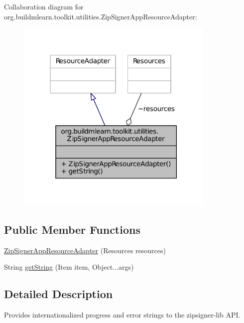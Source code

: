 Collaboration diagram for org.\-buildmlearn.\-toolkit.\-utilities.\-Zip\-Signer\-App\-Resource\-Adapter\-:
\nopagebreak
\begin{figure}[H]
\begin{center}
\leavevmode
\includegraphics[width=270pt]{d7/d6e/classorg_1_1buildmlearn_1_1toolkit_1_1utilities_1_1ZipSignerAppResourceAdapter__coll__graph}
\end{center}
\end{figure}
\subsection*{Public Member Functions}
\begin{DoxyCompactItemize}
\item 
\hyperlink{classorg_1_1buildmlearn_1_1toolkit_1_1utilities_1_1ZipSignerAppResourceAdapter_a7393c43bc6a0252ff9e94867fc04486c}{Zip\-Signer\-App\-Resource\-Adapter} (Resources resources)
\item 
String \hyperlink{classorg_1_1buildmlearn_1_1toolkit_1_1utilities_1_1ZipSignerAppResourceAdapter_a6c0a4c811d706b3989851dc63f45c88a}{get\-String} (Item item, Object...\-args)
\end{DoxyCompactItemize}


\subsection{Detailed Description}
Provides internationalized progress and error strings to the zipsigner-\/lib A\-P\-I. 


